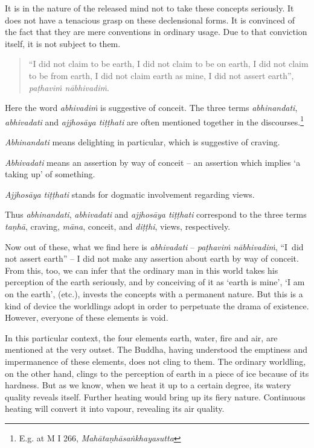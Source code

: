 It is in the nature of the released mind not to take these concepts seriously. It does not have a tenacious grasp on these declensional forms. It is convinced of the fact that they are mere conventions in ordinary usage. Due to that conviction itself, it is not subject to them.

\begin{quote}
``I did not claim to be earth, I did not claim to be on earth, I did not claim to be from earth, I did not claim earth as mine, I did not assert earth'', \emph{paṭhaviṁ nābhivadiṁ}.
\end{quote}

Here the word \emph{abhivadiṁ} is suggestive of conceit. The three terms \emph{abhinandati}, \emph{abhivadati} and \emph{ajjhosāya tiṭṭhati} are often mentioned together in the discourses.\footnote{E.g. at M I 266, \emph{Mahātaṇhāsaṅkhayasutta}}

\emph{Abhinandati} means delighting in particular, which is suggestive of craving.

\emph{Abhivadati} means an assertion by way of conceit -- an assertion which implies `a taking up' of something.

\emph{Ajjhosāya tiṭṭhati} stands for dogmatic involvement regarding views.

Thus \emph{abhinandati}, \emph{abhivadati} and \emph{ajjhosāya tiṭṭhati} correspond to the three terms \emph{taṇhā}, craving, \emph{māna}, conceit, and \emph{diṭṭhi}, views, respectively.

Now out of these, what we find here is \emph{abhivadati} -- \emph{paṭhaviṁ nābhivadiṁ}, ``I~did not assert earth'' -- I did not make any assertion about earth by way of conceit. From this, too, we can infer that the ordinary man in this world takes his perception of the earth seriously, and by conceiving of it as `earth is mine', `I am on the earth', (etc.), invests the concepts with a permanent nature. But this is a kind of device the worldlings adopt in order to perpetuate the drama of existence. However, everyone of these elements is void.

In this particular context, the four elements earth, water, fire and air, are mentioned at the very outset. The Buddha, having understood the emptiness and impermanence of these elements, does not cling to them. The ordinary worldling, on the other hand, clings to the perception of earth in a piece of ice because of its hardness. But as we know, when we heat it up to a certain degree, its watery quality reveals itself. Further heating would bring up its fiery nature. Continuous heating will convert it into vapour, revealing its air quality.


